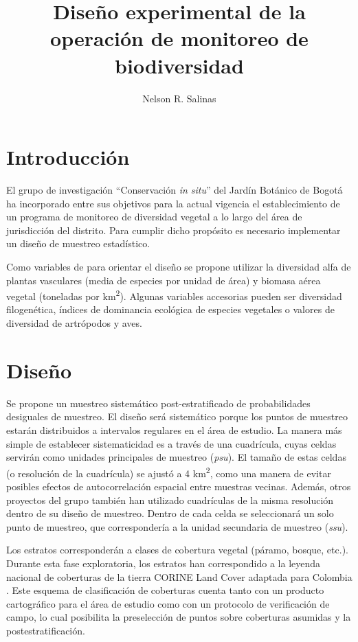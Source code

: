 \documentclass[12pt,letterpaper]{article}
\title{Dise\~no experimental de la operaci\'on de monitoreo de biodiversidad}
\author{Nelson R. Salinas}
\affil{Jard\'in Bot\'anico de Bogot\'a \\ 
Grupo Conservaci\'on \emph{in situ}}
\begin{document}
\maketitle

\section*{Introducci\'on}

El grupo de investigaci\'on ``Conservaci\'on \emph{in situ}'' del Jard\'in Bot\'anico de Bogot\'a ha incorporado entre sus objetivos para la actual vigencia el establecimiento de un programa de monitoreo de diversidad vegetal a lo largo del \'area de jurisdicci\'on del distrito. Para cumplir dicho prop\'osito es necesario implementar un dise\~no de muestreo estad\'istico.

Como variables de para orientar el dise\~no se propone utilizar la diversidad alfa de plantas vasculares (media de especies por unidad de \'area) y biomasa a\'erea vegetal (toneladas por km\textsuperscript{2}). Algunas variables accesorias pueden ser diversidad filogen\'etica, \'indices de dominancia ecol\'ogica de especies vegetales o valores de diversidad de artr\'opodos y aves.

\section*{Dise\~no}

Se propone un muestreo sistem\'atico post-estratificado de probabilidades desiguales de muestreo.
El diseño será sistemático porque los puntos de muestreo estarán distribuidos a intervalos regulares en el área de estudio.
La manera más simple de establecer sistematicidad es a través de una cuadr\'icula, cuyas celdas servir\'an como unidades principales de muestreo (\textit{psu}).
El tama\~no de estas celdas (o resoluci\'on de la cuadr\'icula) se ajustó a 4 km\textsuperscript{2}, como una manera de evitar posibles efectos de autocorrelación espacial entre muestras vecinas. 
Además, otros proyectos del grupo también han utilizado cuadrículas de la misma resolución dentro de su diseño de muestreo.
Dentro de cada celda se seleccionar\'a un solo punto de muestreo, que corresponder\'ia a la unidad secundaria de muestreo (\textit{ssu}). 

Los estratos corresponderán a clases de cobertura vegetal (páramo, bosque, etc.).
Durante esta fase exploratoria, los estratos han correspondido a la leyenda nacional de coberturas de la tierra CORINE Land Cover adaptada para Colombia \citep{ideam2010}.
Este esquema de clasificación de coberturas cuenta tanto con un producto cartográfico para el área de estudio como con un protocolo de verificación de campo, lo cual posibilita la preselección de puntos sobre coberturas asumidas y la postestratificación.
\end{document}

